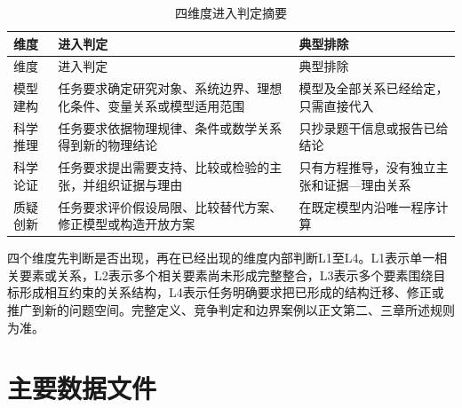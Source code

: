 \documentclass[
  12pt,
  a4paper,twoside,openany]{ctexbook}
\begin{document}
\begin{longtable}[]{@{}
  >{\raggedright\arraybackslash}p{}
  >{\raggedright\arraybackslash}p{}
  >{\raggedright\arraybackslash}p{}@{}}
\caption{四维度进入判定摘要}\tabularnewline
\toprule\noalign{}
\rowcolor{ThesisPale}
\begin{minipage}[b]{\linewidth}\raggedright
维度
\end{minipage} & \begin{minipage}[b]{\linewidth}\raggedright
进入判定
\end{minipage} & \begin{minipage}[b]{\linewidth}\raggedright
典型排除
\end{minipage} \\
\midrule\noalign{}
\endfirsthead
\toprule\noalign{}
\rowcolor{ThesisPale}
\begin{minipage}[b]{\linewidth}\raggedright
维度
\end{minipage} & \begin{minipage}[b]{\linewidth}\raggedright
进入判定
\end{minipage} & \begin{minipage}[b]{\linewidth}\raggedright
典型排除
\end{minipage} \\
\midrule\noalign{}
\endhead
\bottomrule\noalign{}
\endlastfoot
模型建构 &
任务要求确定研究对象、系统边界、理想化条件、变量关系或模型适用范围 &
模型及全部关系已经给定，只需直接代入 \\
科学推理 & 任务要求依据物理规律、条件或数学关系得到新的物理结论 &
只抄录题干信息或报告已给结论 \\
科学论证 & 任务要求提出需要支持、比较或检验的主张，并组织证据与理由 &
只有方程推导，没有独立主张和证据---理由关系 \\
质疑创新 & 任务要求评价假设局限、比较替代方案、修正模型或构造开放方案 &
在既定模型内沿唯一程序计算 \\
\end{longtable}

四个维度先判断是否出现，再在已经出现的维度内部判断L1至L4。L1表示单一相关要素或关系，L2表示多个相关要素尚未形成完整整合，L3表示多个要素围绕目标形成相互约束的关系结构，L4表示任务明确要求把已形成的结构迁移、修正或推广到新的问题空间。完整定义、竞争判定和边界案例以正文第二、三章所述规则为准。

\section{主要数据文件}\label{ux4e3bux8981ux6570ux636eux6587ux4ef6}
\end{document}

